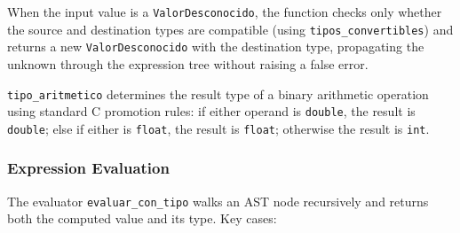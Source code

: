 \documentclass[letterpaper,12pt,oneside]{article}
\begin{document}
When the input value is a \texttt{ValorDesconocido}, the function checks only whether the source and destination types are compatible (using \texttt{tipos\_convertibles}) and returns a new \texttt{ValorDesconocido} with the destination type, propagating the unknown through the expression tree without raising a false error.

\texttt{tipo\_aritmetico} determines the result type of a binary arithmetic operation using standard C promotion rules: if either operand is \texttt{double}, the result is \texttt{double}; else if either is \texttt{float}, the result is \texttt{float}; otherwise the result is \texttt{int}.

\subsubsection{Expression Evaluation}
The evaluator \texttt{evaluar\_con\_tipo} walks an AST node recursively and returns both the computed value and its type. Key cases:
\end{document}
